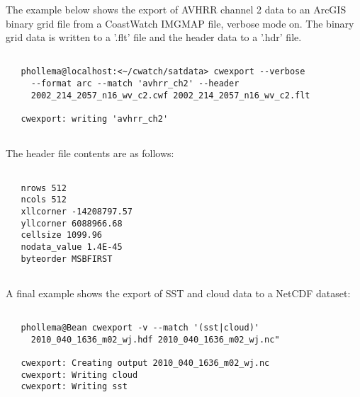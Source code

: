  The example below shows the export of AVHRR channel 2 data to an ArcGIS binary grid file from a CoastWatch IMGMAP file, verbose mode on. The binary grid data is written to a '.flt' file and the header data to a '.hdr' file. \begin{verbatim}

   phollema@localhost:<~/cwatch/satdata> cwexport --verbose 
     --format arc --match 'avhrr_ch2' --header 
     2002_214_2057_n16_wv_c2.cwf 2002_214_2057_n16_wv_c2.flt

   cwexport: writing 'avhrr_ch2'
 
\end{verbatim}
 The header file contents are as follows: \begin{verbatim}

   nrows 512
   ncols 512
   xllcorner -14208797.57
   yllcorner 6088966.68
   cellsize 1099.96
   nodata_value 1.4E-45
   byteorder MSBFIRST
 
\end{verbatim}
 A final example shows the export of SST and cloud data to a NetCDF dataset: \begin{verbatim}

   phollema@Bean cwexport -v --match '(sst|cloud)' 
     2010_040_1636_m02_wj.hdf 2010_040_1636_m02_wj.nc"

   cwexport: Creating output 2010_040_1636_m02_wj.nc
   cwexport: Writing cloud
   cwexport: Writing sst
 
\end{verbatim}
